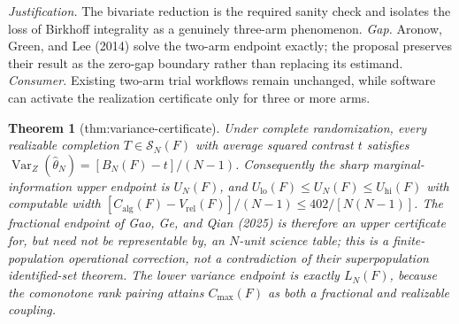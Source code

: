 \documentclass{article}
\newtheorem{theorem}{Theorem}
\begin{document}
\par\smallskip\noindent \textit{Justification.} The bivariate reduction is the required sanity check and isolates the loss of Birkhoff integrality as a genuinely three-arm phenomenon. \textit{Gap.} Aronow, Green, and Lee (2014) solve the two-arm endpoint exactly; the proposal preserves their result as the zero-gap boundary rather than replacing its estimand. \textit{Consumer.} Existing two-arm trial workflows remain unchanged, while software can activate the realization certificate only for three or more arms.

\begin{theorem}[thm:variance-certificate]\label{thm:variance-certificate}
Under complete randomization, every realizable completion \(T\in\mathcal S_N(F)\) with average squared contrast \(t\) satisfies \(\operatorname{Var}_Z(\widehat\theta_N)=[B_N(F)-t]/(N-1)\).  Consequently the sharp marginal-information upper endpoint is \(U_N(F)\), and \(U_{\mathrm{lo}}(F)\le U_N(F)\le U_{\mathrm{hi}}(F)\) with computable width \([C_{\mathrm{alg}}(F)-V_{\mathrm{rel}}(F)]/(N-1)\le402/[N(N-1)]\).  The fractional endpoint of Gao, Ge, and Qian (2025) is therefore an upper certificate for, but need not be representable by, an \(N\)-unit science table; this is a finite-population operational correction, not a contradiction of their superpopulation identified-set theorem.  The lower variance endpoint is exactly \(L_N(F)\), because the comonotone rank pairing attains \(C_{\max}(F)\) as both a fractional and realizable coupling.
\end{theorem}
\end{document}
